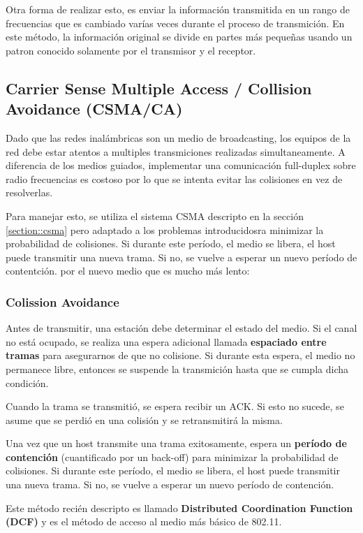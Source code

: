 Otra forma de realizar esto, es enviar la información transmitida en un rango de frecuencias que es cambiado varías veces durante el proceso de transmición. En este método, la información original se divide en partes más pequeñas usando un patron conocido solamente por el transmisor y el receptor.

\subsection{Carrier Sense Multiple Access / Collision Avoidance (CSMA/CA)}

Dado que las redes inalámbricas son un medio de broadcasting, los equipos de la red debe estar atentos a multiples transmiciones realizadas simultaneamente. 
A diferencia de los medios guiados, implementar una comunicación full-duplex sobre radio frecuencias es costoso por lo que se intenta evitar las colisiones en vez de resolverlas.

Para manejar esto, se utiliza el sistema CSMA descripto en la sección \ref{section::csma} pero adaptado a los problemas introducidosra minimizar la probabilidad de colisiones. Si durante este período, el medio se libera, el host puede transmitir una nueva trama. Si no, se vuelve a esperar un nuevo período de contentción. por el nuevo medio que es mucho más lento:

\subsubsection{Colission Avoidance}
Antes de transmitir, una estación debe determinar el estado del medio. Si el canal no está ocupado, se realiza una espera adicional llamada \textbf{espaciado entre tramas} para asegurarnos de que no colisione.  Si durante esta espera, el medio no permanece libre, entonces se suspende la transmición hasta que se cumpla dicha condición.

Cuando la trama se transmitió, se espera recibir un ACK. Si esto no sucede, se asume que se perdió en una colisión y se retransmitirá la misma. 

Una vez que un host transmite una trama exitosamente, espera un \textbf{período de contención} (cuantificado por un back-off) para minimizar la probabilidad de colisiones. Si durante este período, el medio se libera, el host puede transmitir una nueva trama. Si no, se vuelve a esperar un nuevo período de contención.

Este método recién descripto es llamado \textbf{Distributed Coordination Function (DCF)} y es el método de acceso al medio más básico de 802.11.


